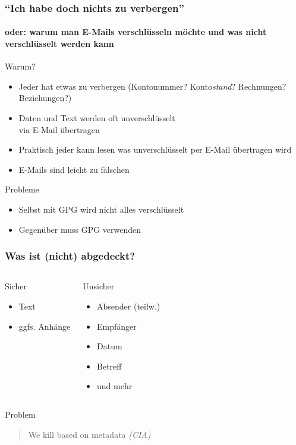 \documentclass{beamer}
\begin{document}
\begin{frame}
  \frametitle{``Ich habe doch nichts zu verbergen''}
  \framesubtitle{oder: warum man E-Mails verschlüsseln möchte und was nicht verschlüsselt werden kann}

  \begin{block}{Warum?}
    \begin{itemize}
    \item Jeder hat etwas zu verbergen (Kontonummer? Konto\emph{stand}?
      Rechnungen? Beziehungen?)
    \item Daten und Text werden oft unverschlüsselt\\via E-Mail übertragen
    \small
    \item Praktisch jeder kann lesen was unverschlüsselt per E-Mail übertragen
      wird
    \item E-Mails sind leicht zu fälschen
    \end{itemize}
  \end{block}
  \pause
  \begin{block}{Probleme}
    \begin{itemize}
    \item Selbst mit GPG wird nicht alles verschlüsselt
    \item Gegenüber muss GPG verwenden
    \end{itemize}
  \end{block}
\end{frame}

\begin{frame}
  \frametitle{Was ist (nicht) abgedeckt?}
  \begin{columns}
    \begin{block}{Sicher}
      \begin{itemize}
      \item Text
      \item ggfs. Anhänge
      \end{itemize}
    \end{block}
    \begin{block}{Unsicher}
      \begin{itemize}
      \item Absender (teilw.)
      \item Empfänger
      \item Datum
      \item Betreff
      \item und mehr
      \end{itemize}
    \end{block}
  \end{columns}
  \pause
  \begin{block}{Problem}
    \begin{quote}
      We kill based on metadata \emph{(CIA)}
    \end{quote}
  \end{block}
\end{frame}
\end{document}
